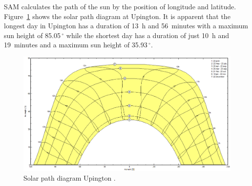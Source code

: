 \newpage \noindent
SAM calculates the path of the sun by the position of longitude and latitude. Figure~\ref{SunPathUpington} shows the solar path diagram at Upington. It is apparent that the longest day in Upington has a duration of 13~h and 56~minutes with a maximum sun height of 85.05$\,^{\circ}$ while the shortest day has a duration of just 10~h and 19~minutes and a maximum sun height of 35.93$\,^{\circ}$.

\begin{figure}[htbp]  
\centering
\includegraphics[width=0.95\linewidth]{FIG/SunPathUpington}
\caption[Solar path diagram for Upington.]{Solar path diagram Upington \cite{PVsystSA2015}.}\label{SunPathUpington}
\end{figure}
\pagebreak 
